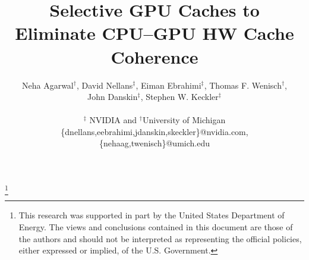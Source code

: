 \documentclass{sig-alternate}
\title{\vspace{-0.2in}Selective GPU Caches to\\Eliminate CPU--GPU HW Cache Coherence\vspace{-0.2in}}
\author{Neha Agarwal$^{\dagger}$, 
David Nellans$^{\ddagger}$,
Eiman Ebrahimi$^{\ddagger}$,
Thomas F. Wenisch$^{\dagger}$,\\
John Danskin$^{\ddagger}$,
Stephen W. Keckler$^{\ddagger}$\\\\
$^{\ddagger}$ NVIDIA and $^{\dagger}$University of Michigan \\
\{dnellans,eebrahimi,jdanskin,skeckler\}@nvidia.com, \{nehaag,twenisch\}@umich.edu
}
\begin{document}
\thanks{This research was supported in part by the United States Department of Energy. The views and conclusions contained in this document are those of the authors and 
should not be interpreted as representing the official policies, either expressed or implied, of the U.S. Government.}
\maketitle
\thispagestyle{firstpage}
\pagestyle{plain}










\end{document}
